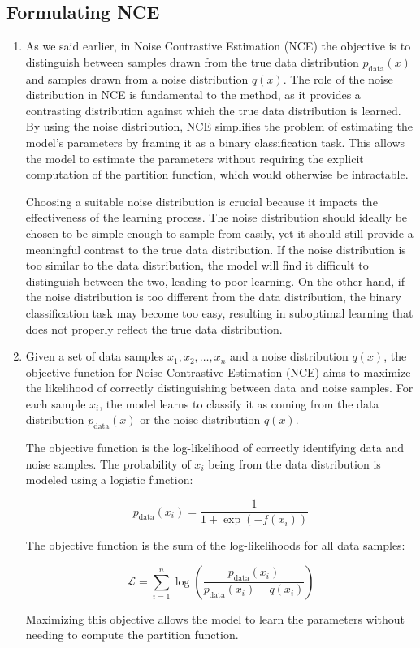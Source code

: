 \documentclass{article}
\begin{document}
\subsection{Formulating NCE}
\begin{enumerate}
\item

As we said earlier, in Noise Contrastive Estimation (NCE) the objective is to distinguish between samples drawn from the true data distribution \( p_{\text{data}}(x) \) and samples drawn from a noise distribution \( q(x) \). The role of the noise distribution in NCE is fundamental to the method, as it provides a contrasting distribution against which the true data distribution is learned. By using the noise distribution, NCE simplifies the problem of estimating the model’s parameters by framing it as a binary classification task. This allows the model to estimate the parameters without requiring the explicit computation of the partition function, which would otherwise be intractable.

Choosing a suitable noise distribution is crucial because it impacts the effectiveness of the learning process. The noise distribution should ideally be chosen to be simple enough to sample from easily, yet it should still provide a meaningful contrast to the true data distribution. If the noise distribution is too similar to the data distribution, the model will find it difficult to distinguish between the two, leading to poor learning. On the other hand, if the noise distribution is too different from the data distribution, the binary classification task may become too easy, resulting in suboptimal learning that does not properly reflect the true data distribution.
\item
Given a set of data samples \( x_1, x_2, \dots, x_n \) and a noise distribution \( q(x) \), the objective function for Noise Contrastive Estimation (NCE) aims to maximize the likelihood of correctly distinguishing between data and noise samples. For each sample \( x_i \), the model learns to classify it as coming from the data distribution \( p_{\text{data}}(x) \) or the noise distribution \( q(x) \).

The objective function is the log-likelihood of correctly identifying data and noise samples. The probability of \( x_i \) being from the data distribution is modeled using a logistic function:

\[
p_{\text{data}}(x_i) = \frac{1}{1 + \exp(-f(x_i))}
\]

The objective function is the sum of the log-likelihoods for all data samples:

\[
\mathcal{L} = \sum_{i=1}^{n} \log \left( \frac{p_{\text{data}}(x_i)}{p_{\text{data}}(x_i) + q(x_i)} \right)
\]

Maximizing this objective allows the model to learn the parameters without needing to compute the partition function.

\end{enumerate}
\end{document}
